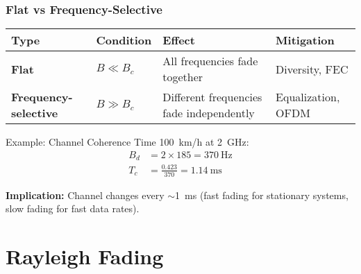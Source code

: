 \subsubsection{Flat vs
Frequency-Selective}\label{flat-vs-frequency-selective}

{\def\LTcaptype{} %
\begin{longtable}[]{@{}
  >{\raggedright\arraybackslash}p{}
  >{\raggedright\arraybackslash}p{}
  >{\raggedright\arraybackslash}p{}
  >{\raggedright\arraybackslash}p{}@{}}
\toprule\noalign{}
\begin{minipage}[b]{\linewidth}\raggedright
Type
\end{minipage} & \begin{minipage}[b]{\linewidth}\raggedright
Condition
\end{minipage} & \begin{minipage}[b]{\linewidth}\raggedright
Effect
\end{minipage} & \begin{minipage}[b]{\linewidth}\raggedright
Mitigation
\end{minipage} \\
\midrule\noalign{}
\endhead
\bottomrule\noalign{}
\endlastfoot
\textbf{Flat} & \(B \ll B_c\) & All frequencies fade together &
Diversity, FEC \\
\textbf{Frequency-selective} & \(B \gg B_c\) & Different frequencies
fade independently & Equalization, OFDM \\
\end{longtable}
}

\begin{calloutbox}{Example: Channel Coherence Time}
100~km/h at 2~GHz:
\begin{align*}
B_d &= 2 \times 185 = 370~\text{Hz} \\
T_c &= \frac{0.423}{370} = 1.14~\text{ms}
\end{align*}

\textbf{Implication:} Channel changes every $\sim$1~ms (fast fading for stationary systems, slow fading for fast data rates).
\end{calloutbox}

\section{Rayleigh Fading}

